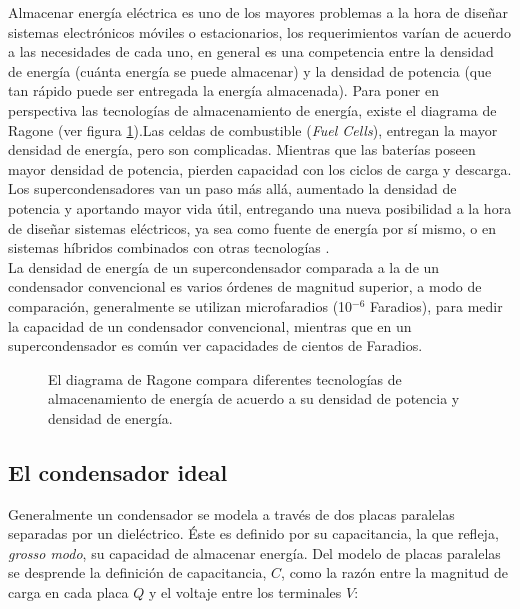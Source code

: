 Almacenar energía eléctrica es uno de los mayores problemas a la hora de diseñar sistemas electrónicos móviles o estacionarios, los requerimientos varían de acuerdo a las necesidades de cada uno, en general es una competencia entre la densidad de energía (cuánta energía se puede almacenar) y la densidad de potencia (que tan rápido puede ser entregada la energía almacenada). Para poner en perspectiva las tecnologías de almacenamiento de energía, existe el diagrama de Ragone (ver figura \ref{fig:ragone}).Las celdas de combustible (\textit{Fuel Cells}), entregan la mayor densidad de energía, pero son complicadas. Mientras que las baterías poseen mayor densidad de potencia, pierden capacidad con los ciclos de carga y descarga. Los supercondensadores van un paso más allá, aumentado la densidad de potencia y aportando mayor vida útil, entregando una nueva posibilidad a la hora de diseñar sistemas eléctricos, ya sea como fuente de energía por sí mismo, o en sistemas híbridos combinados con otras tecnologías \citep{Thounthong2009}.\\
La densidad de energía de un supercondensador comparada a la de un condensador convencional es varios órdenes de magnitud superior, a modo de comparación, generalmente se utilizan microfaradios (10$^{-6}$ Faradios), para medir la capacidad de un condensador convencional, mientras que en un supercondensador es común ver capacidades de cientos de Faradios.


\begin{figure}
	\centering
	\caption[Diagrama de Ragone]{El diagrama de Ragone compara diferentes tecnologías de almacenamiento de energía de acuerdo a su densidad de potencia y densidad de energía.}
	\label{fig:ragone}
\end{figure}

\subsection{El condensador ideal}
Generalmente un condensador se modela a través de dos placas paralelas separadas por un dieléctrico. Éste es definido por su capacitancia, la que refleja, \emph{grosso modo}, su capacidad de almacenar energía. Del modelo de placas paralelas se desprende la definición de capacitancia, $C$, como la razón entre la magnitud de carga en cada placa $Q$ y el voltaje entre los terminales $V$:

